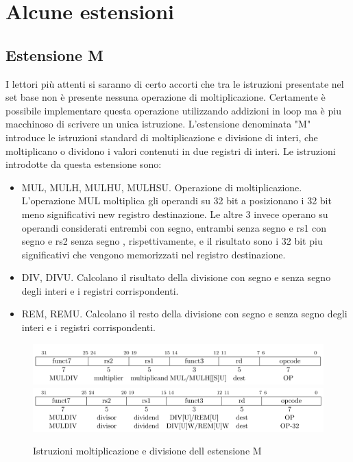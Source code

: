\documentclass[12pt,a4paper]{report}
\begin{document}
\section{Alcune estensioni}
\subsection{Estensione M}
I lettori più attenti si saranno di certo accorti che tra le istruzioni presentate nel set base non è presente nessuna operazione di moltiplicazione. Certamente è possibile implementare questa operazione utilizzando addizioni in loop ma è piu macchinoso di scrivere un unica istruzione. L'estensione denominata "M" introduce le istruzioni standard di moltiplicazione e divisione di interi, che moltiplicano o dividono i valori contenuti in due registri di interi. Le istruzioni introdotte da questa estensione sono:
\begin{itemize}
\item MUL, MULH, MULHU, MULHSU.  Operazione di moltiplicazione. L'operazione MUL moltiplica gli operandi su 32 bit a posizionano i 32 bit meno significativi new registro destinazione. Le altre 3 invece operano su operandi considerati entrembi con segno, entrambi senza segno e rs1 con segno e rs2 senza segno , rispettivamente, e il risultato sono i 32 bit piu significativi che vengono memorizzati nel registro destinazione.
\item DIV, DIVU. Calcolano il risultato della divisione con segno e senza segno degli interi e i registri corrispondenti.
\item REM, REMU. Calcolano il resto della divisione con segno e senza segno degli interi e i registri corrispondenti.
\end{itemize}
\begin{figure}
	\includegraphics[width = \textwidth]{Istruzioni/IstruzioniM/Istruction1_M.png}
	\includegraphics[width = \textwidth]{Istruzioni/IstruzioniM/Istruction2_M.png}
	\caption{Istruzioni moltiplicazione e divisione dell estensione M}
	\label{Fig:IstruzioniM}
\end{figure}
\end{document}
